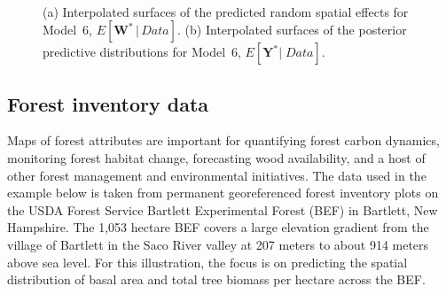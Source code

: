 \documentclass[a4paper]{article}
\newcommand{\bW}{\textbf{W}}
\newcommand{\bY}{\textbf{Y}}
\begin{document}
\begin{figure}[h!]
  \begin{center}
    \\
  \end{center}
  \caption{(a) Interpolated surfaces of the predicted random spatial effects for Model~6, $E[\bW^{\ast}\,|\, Data]$. (b) Interpolated surfaces of the posterior predictive distributions for Model~6, $E[\bY^{\ast}|\; Data]$.}
  \label{SymPred}
\end{figure}
\clearpage
\subsection{Forest inventory data}\label{RealData}
Maps of forest attributes are important for quantifying forest carbon dynamics, monitoring forest habitat change, forecasting wood availability, and a host of other forest management and environmental initiatives.  The data used in the example below is taken from permanent georeferenced forest inventory plots on the USDA Forest Service Bartlett Experimental Forest (BEF) in Bartlett, New Hampshire.  The 1,053 hectare BEF covers a large elevation gradient from the village of Bartlett in the Saco River valley at 207 meters to about 914 meters above sea level. For this illustration, the focus is on predicting the spatial distribution of basal area and total tree biomass per hectare across the BEF.
\end{document}
